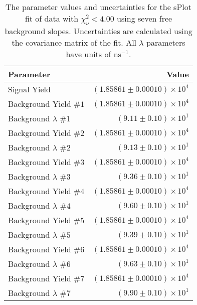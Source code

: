 
\begin{table}[ht]
    \begin{center}
        \begin{tabular}{lr}\toprule
            Parameter & Value \\\midrule
            Signal Yield & $(1.85861 \pm 0.00010) \times 10^{4}$ \\
            Background Yield $\#1$ & $(1.85861 \pm 0.00010) \times 10^{4}$ \\
            Background $\lambda$ $\#1$ & $(9.11 \pm 0.10) \times 10^{1}$ \\
            Background Yield $\#2$ & $(1.85861 \pm 0.00010) \times 10^{4}$ \\
            Background $\lambda$ $\#2$ & $(9.13 \pm 0.10) \times 10^{1}$ \\
            Background Yield $\#3$ & $(1.85861 \pm 0.00010) \times 10^{4}$ \\
            Background $\lambda$ $\#3$ & $(9.36 \pm 0.10) \times 10^{1}$ \\
            Background Yield $\#4$ & $(1.85861 \pm 0.00010) \times 10^{4}$ \\
            Background $\lambda$ $\#4$ & $(9.60 \pm 0.10) \times 10^{1}$ \\
            Background Yield $\#5$ & $(1.85861 \pm 0.00010) \times 10^{4}$ \\
            Background $\lambda$ $\#5$ & $(9.39 \pm 0.10) \times 10^{1}$ \\
            Background Yield $\#6$ & $(1.85861 \pm 0.00010) \times 10^{4}$ \\
            Background $\lambda$ $\#6$ & $(9.63 \pm 0.10) \times 10^{1}$ \\
            Background Yield $\#7$ & $(1.85861 \pm 0.00010) \times 10^{4}$ \\
            Background $\lambda$ $\#7$ & $(9.90 \pm 0.10) \times 10^{1}$ \\\bottomrule
        \end{tabular}
        \caption{The parameter values and uncertainties for the sPlot fit of data with $\chi^2_\nu < 4.00$ using seven free background slopes. Uncertainties are calculated using the covariance matrix of the fit. All $\lambda$ parameters have units of $\si{\nano\second}^{-1}$.}\label{tab:splot-fit-results-chisqdof-4.00-free-7}
    \end{center}
\end{table}
